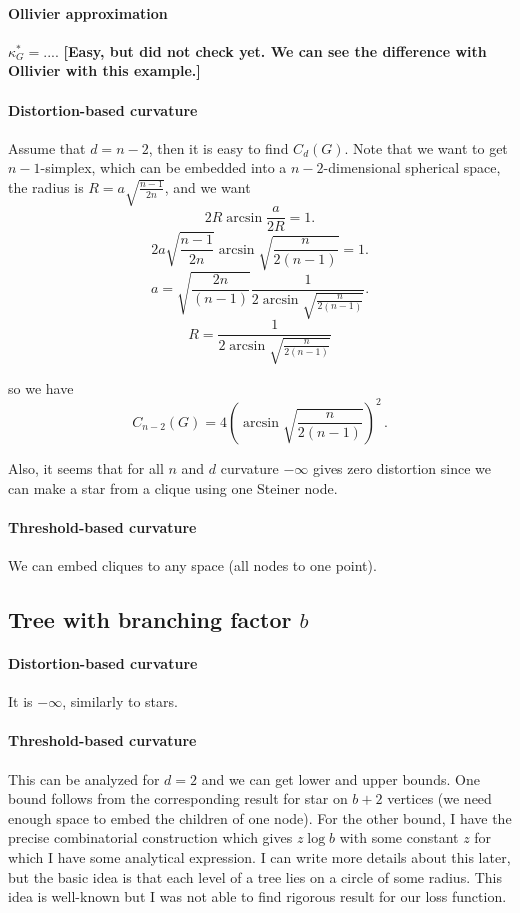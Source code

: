 \documentclass{article}
\begin{document}
\paragraph{Ollivier approximation} $\kappa_G^* = ...$. \textbf{[Easy, but did not check yet. We can see the difference with Ollivier with this example.]}

\paragraph{Distortion-based curvature} Assume that $d = n-2$, then it is easy to find $C_d(G)$. Note that we want to get $n-1$-simplex, which can be embedded into a $n-2$-dimensional spherical space, the radius is $R = a\sqrt{\frac{n-1}{2n}}$, and we want
\[
2 R \arcsin \frac{a}{2R} = 1.
\]
\[
2 a\sqrt{\frac{n-1}{2n}} \arcsin \sqrt{\frac{n}{2(n-1)}} = 1.
\]
\[
a  = \sqrt{\frac{2n}{(n-1)}}\frac{1}{2\arcsin \sqrt{\frac{n}{2(n-1)}}}.
\]
\[
R = \frac{1}{2\arcsin \sqrt{\frac{n}{2(n-1)}}}
\]

so we have
\[
C_{n-2}(G) = 4 \left(\arcsin \sqrt{\frac{n}{2(n-1)}}\right)^2\,.
\]

Also, it seems that for all $n$ and $d$ curvature $-\infty$ gives zero distortion since we can make a star from a clique using one Steiner node.

\paragraph{Threshold-based curvature} We can embed cliques to any space (all nodes to one point).

\subsection{Tree with branching factor $b$}

\paragraph{Distortion-based curvature} It is $-\infty$, similarly to stars.

\paragraph{Threshold-based curvature} This can be analyzed for $d = 2$ and we can get lower and upper bounds. One bound follows from the corresponding result for star on $b+2$ vertices (we need enough space to embed the children of one node). For the other bound, I have the precise combinatorial construction which gives $z\log{b}$ with some constant $z$ for which I have some analytical expression. I can write more details about this later, but the basic idea is that each level of a tree lies on a circle of some radius. This idea is well-known but I was not able to find rigorous result for our loss function.
\end{document}
